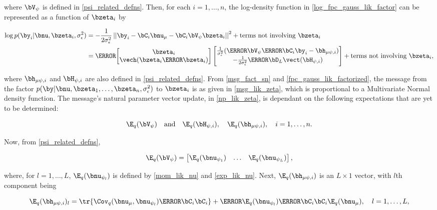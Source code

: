 \documentclass[12pt]{article}
\def\sigsqeps{\sigma^2_{\epsilon}}
\def\numu{\bnu_\mu}
\def\Vpsi{\bV_\psi}
\newcommand\nupsi[1]{\bnu_{\psi_{#1}}}
\newcommand\hmupsi[1]{\bh_{\mu \psi, i}}
\newcommand\Hpsi[1]{\bH_{\psi, i}}
\newcommand\tni[1]{\text{terms not involving $#1$}}
\theoremstyle{plain}
\theoremstyle{definition}
\theoremstyle{remark}
\begin{document}
\noindent where $\Vpsi$ is defined in \eqref{psi_related_defns}. Then, for each $i = 1, \dots, n$, the log-density function
in \eqref{log_fpc_gauss_lik_factor} can be represented as a function of $\bzeta_i$ by

\begin{align*}
	\log p (\by_i | \bnu, \bzeta_i, \sigsqeps)
		& = -\frac{1}{2\sigsqeps} \left|\left|
			\by_i - \bC_i \numu - \bC_i \Vpsi \bzeta_i
		\right|\right|^2 + \tni{\bzeta_i} \\
		& = \T{
			\begin{bmatrix}
				\bzeta_i \\
				\vech (\bzeta_i \T{\bzeta_i})
			\end{bmatrix}
		} \begin{bmatrix}
			\frac{1}{\sigsqeps} (\T{\Vpsi} \T{\bC_i} \by_i - \hmupsi{i}) \\
			-\frac{1}{2 \sigsqeps} \T{\bD_L} \vect (\Hpsi{i})
		\end{bmatrix} + \tni{\bzeta_i},
\end{align*}

\noindent where $\hmupsi{i}$ and $\Hpsi{i}$ are also defined in \eqref{psi_related_defns}.
\noindent From \eqref{msg_fact_sn} and \eqref{fpc_gauss_lik_factorized}, the message from the factor
$p (\by | \bnu, \bzeta_1, \dots, \bzeta_n, \sigsqeps)$ to $\bzeta_i$ is as given in \eqref{msg_lik_zeta}, which
is proportional to a Multivariate Normal density function. The message's natural parameter vector update, in
\eqref{np_lik_zeta}, is dependant on the following expectations that are yet to be determined:

\[
	\E_q (\Vpsi) \quad \text{and} \quad \E_q (\Hpsi{i}), \quad \E_q (\hmupsi{i}), \quad i = 1, \dots, n.
\]

\noindent Now, from \eqref{psi_related_defns},

\begin{equation}
	\E_q (\Vpsi) = \begin{bmatrix}
		\E_q (\nupsi{1}) & \dots & \E_q (\nupsi{L})
	\end{bmatrix},
\label{E_q_Vpsi}
\end{equation}

\noindent where, for $l = 1, \dots, L$, $\E_q (\nupsi{l})$ is defined by \eqref{mom_lik_nu} and \eqref{exp_lik_nu}.
Next, $\E_q (\hmupsi{i})$ is an $L \times 1$ vector, with $l$th component being

\begin{equation}
	\E_q (\hmupsi{i})_l =
		\tr \{ \Cov_q (\numu, \nupsi{l}) \T{\bC_i} \bC_i \}
		+ \T{\E_q (\nupsi{l})} \T{\bC_i} \bC_i \E_q (\numu), \quad
	l = 1, \dots, L,
\label{exp_lik_hmupsi}
\end{equation}
\end{document}
